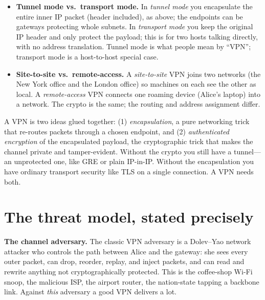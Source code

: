 \begin{itemize}
\item \textbf{Tunnel mode vs.\ transport mode.} In \emph{tunnel mode} you encapsulate the entire inner IP packet (header included), as above; the endpoints can be gateways protecting whole subnets. In \emph{transport mode} you keep the original IP header and only protect the payload; this is for two hosts talking directly, with no address translation. Tunnel mode is what people mean by ``VPN''; transport mode is a host-to-host special case.
\item \textbf{Site-to-site vs.\ remote-access.} A \emph{site-to-site} VPN joins two networks (the New York office and the London office) so machines on each see the other as local. A \emph{remote-access} VPN connects one roaming device (Alice's laptop) into a network. The crypto is the same; the routing and address assignment differ.
\end{itemize}

\begin{focusbox}
A VPN is two ideas glued together: (1) \emph{encapsulation}, a pure networking trick that re-routes packets through a chosen endpoint, and (2) \emph{authenticated encryption} of the encapsulated payload, the cryptographic trick that makes the channel private and tamper-evident. Without the crypto you still have a tunnel---an unprotected one, like GRE or plain IP-in-IP. Without the encapsulation you have ordinary transport security like TLS on a single connection. A VPN needs both.
\end{focusbox}

\section{The threat model, stated precisely}
\label{ch30:threat}

\textbf{The channel adversary.} The classic VPN adversary is a Dolev--Yao network attacker who controls the path between Alice and the gateway: she sees every outer packet, can drop, reorder, replay, and inject packets, and can read and rewrite anything not cryptographically protected. This is the coffee-shop Wi-Fi snoop, the malicious ISP, the airport router, the nation-state tapping a backbone link. Against \emph{this} adversary a good VPN delivers a lot.

